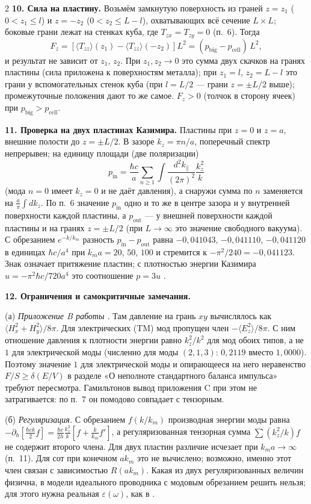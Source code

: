 \documentclass[twoside, 10pt]{article}
\begin{document}
\begin{multicols}{2}
\textbf{10. Сила на пластину.} Возьмём замкнутую поверхность из граней $z=z_1$
($0<z_1\le l$) и $z=-z_2$ ($0<z_2\le L-l$), охватывающих всё сечение $L\times L$;
боковые грани лежат на стенках куба, где $T_{zx}=T_{zy}=0$ (п.~6). Тогда
\[
F_z=\left[\langle T_{zz}\rangle(z_1)-\langle T_{zz}\rangle(-z_2)\right]L^2=(p_{\text{big}}-p_{\text{cell}})\,L^2,
\]
и результат не зависит от $z_1$, $z_2$. При $z_1,z_2\to0$ это сумма двух скачков на
гранях пластины (сила приложена к поверхностям металла); при $z_1=l$,
$z_2=L-l$ это грани у вспомогательных стенок куба (при $l=L/2$ --- грани
$z=\pm L/2$ выше); промежуточные положения дают то же самое. $F_z>0$ (толчок в
сторону ячеек) при $p_{\text{big}}>p_{\text{cell}}$.

\textbf{11. Проверка на двух пластинах Казимира.} Пластины при $z=0$ и $z=a$,
внешние полости до $z=\pm L/2$. В зазоре $k_z=\pi n/a$, поперечный спектр
непрерывен; на единицу площади (две поляризации)
\[
p_{\text{in}}=\frac{\hbar c}{a}\sum_{n\ge1}\int\frac{d^2k_\parallel}{(2\pi)^2}\frac{k_z^2}{k}
\]
(мода $n=0$ имеет $k_z=0$ и не даёт давления), а снаружи сумма по $n$ заменяется
на $\frac a\pi\int dk_z$. По п.~6 значение $p_{\text{in}}$ одно и то же в центре
зазора и у внутренней поверхности каждой пластины, а $p_{\text{out}}$ --- у внешней
поверхности каждой пластины и на гранях $z=\pm L/2$ (при $L\to\infty$ это значение
свободного вакуума). С обрезанием $e^{-k/k_m}$ разность $p_{\text{in}}-p_{\text{out}}$
равна $-0{,}041043$, $-0{,}041110$, $-0{,}041120$ в единицах $\hbar c/a^4$ при
$k_ma=20$, $50$, $100$ и стремится к $-\pi^2/240=-0{,}041123$. Знак означает
притяжение пластин; с плотностью энергии Казимира
$u=-\pi^2\hbar c/720a^4$ это соотношение $p=3u$ \cite{BrownMaclay1969}.

\textbf{12. Ограничения и самокритичные замечания.}

(а) \textit{Приложение B работы \cite{Drozdov2024}.} Там давление на грань $xy$
вычислялось как $\langle H_x^2+H_y^2\rangle/8\pi$. Для электрических (TM) мод
пропущен член $-\langle E_z^2\rangle/8\pi$. С ним отношение давления к плотности
энергии равно $k_z^2/k^2$ для мод обоих типов, а не $1$ для электрической моды
(численно для моды $(2,1,3)$: $0{,}2119$ вместо $1{,}0000$). Поэтому значение $1$ для
электрической моды и опирающееся на него неравенство $F/S\ge\delta(E/V)$ в разделе
«О неполноте стандартного баланса импульса» требуют пересмотра. Гамильтонов вывод
приложения C при этом не затрагивается: по п.~7 он помодово совпадает с тензорным.

(б) \textit{Регуляризация.} С обрезанием $f(k/k_m)$ производная энергии моды равна
$-\partial_h\!\left[\frac{\hbar ck}{2}f\right]=\frac{\hbar c}{2h}\frac{k_z^2}{k}\left[f+\frac{k}{k_m}f'\right]$,
а регуляризованная тензорная сумма $\sum(k_z^2/k)f$ не содержит второго члена.
Для двух пластин различие исчезает при $k_ma\to\infty$ (п.~11). Для сот при конечном
$ak_m$ это не вычислено; возможно, именно этот член связан с зависимостью
$R(ak_m)$. Какая из двух регуляризованных величин физична, в модели идеального
проводника с модовым обрезанием решить нельзя; для этого нужна реальная
$\varepsilon(\omega)$, как в \cite{DLP1961}.


\end{multicols}
\end{document}
